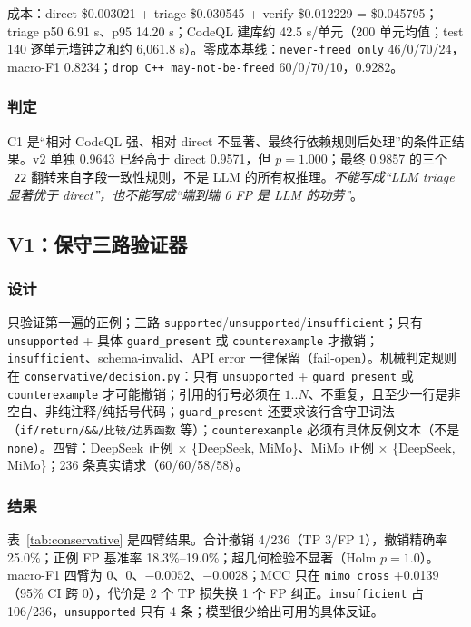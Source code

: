 \documentclass[conference]{IEEEtran}
\begin{document}
成本：direct \$0.003021 + triage \$0.030545 + verify \$0.012229 = \$0.045795；triage p50 6.91 s、p95 14.20 s；CodeQL 建库约 42.5 s/单元（200 单元均值；test 140 逐单元墙钟之和约 6{,}061.8 s）。零成本基线：\texttt{never-freed only} 46/0/70/24，macro-F1 0.8234；\texttt{drop C++ may-not-be-freed} 60/0/70/10，0.9282。

\subsubsection{判定}

C1 是“相对 CodeQL 强、相对 direct 不显著、最终行依赖规则后处理”的条件正结果。v2 单独 0.9643 已经高于 direct 0.9571，但 $p=1.000$；最终 0.9857 的三个 \texttt{\_22} 翻转来自字段一致性规则，不是 LLM 的所有权推理。\emph{不能写成“LLM triage 显著优于 direct”，也不能写成“端到端 0 FP 是 LLM 的功劳”}。

\subsection{V1：保守三路验证器}
\label{sec:v1}

\subsubsection{设计}

只验证第一遍的正例；三路 \texttt{supported}/\texttt{unsupported}/\texttt{insufficient}；只有 \texttt{unsupported} + 具体 \texttt{guard\_present} 或 \texttt{counterexample} 才撤销；\texttt{insufficient}、schema-invalid、API error 一律保留（fail-open）。机械判定规则在 \texttt{conservative/decision.py}：只有 \texttt{unsupported} + \texttt{guard\_present} 或 \texttt{counterexample} 才可能撤销；引用的行号必须在 $1..N$、不重复，且至少一行是非空白、非纯注释/纯括号代码；\texttt{guard\_present} 还要求该行含守卫词法（\texttt{if/return/\&\&/比较/边界函数} 等）；\texttt{counterexample} 必须有具体反例文本（不是 \texttt{none}）。四臂：DeepSeek 正例 $\times$ \{DeepSeek, MiMo\}、MiMo 正例 $\times$ \{DeepSeek, MiMo\}；236 条真实请求（60/60/58/58）。

\subsubsection{结果}

表~\ref{tab:conservative} 是四臂结果。合计撤销 4/236（TP 3/FP 1），撤销精确率 25.0\%；正例 FP 基准率 18.3\%--19.0\%；超几何检验不显著（Holm $p=1.0$）。macro-F1 四臂为 0、0、$-0.0052$、$-0.0028$；MCC 只在 \texttt{mimo\_cross} +0.0139（95\% CI 跨 0），代价是 2 个 TP 损失换 1 个 FP 纠正。\texttt{insufficient} 占 106/236，\texttt{unsupported} 只有 4 条；模型很少给出可用的具体反证。
\end{document}
